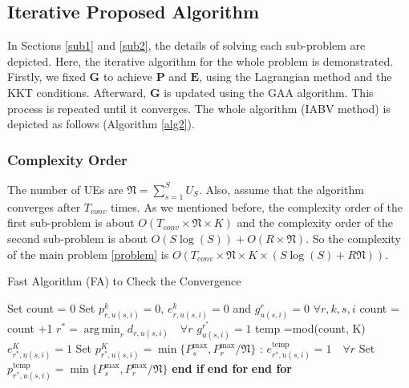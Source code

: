 \documentclass[lettersize,journal]{IEEEtran}
\DeclareMathOperator*{\argmin}{arg\,min}
\begin{document}
\subsection{Iterative Proposed Algorithm}
In Sections \eqref{sub1} and \eqref{sub2}, the details of solving each sub-problem are depicted.
Here, the iterative algorithm for the whole problem is demonstrated.
Firstly, we fixed $\boldsymbol{G}$ to achieve $\boldsymbol{P}$ and $\boldsymbol{E}$, using the Lagrangian method and the KKT conditions.
Afterward, $\boldsymbol{G}$ is updated using the GAA algorithm. This process is repeated until it converges.
The whole algorithm (IABV method) is depicted as follows (Algorithm \ref{alg2}).

\subsubsection{Complexity Order}
The number of UEs are $\mathfrak{N} = \sum_{s=1}^{S}U_S$.
Also, assume that the algorithm converges after $T_{conv}$ times.
As we mentioned before, the complexity order of the first sub-problem is about $O(T_{conv} \times \mathfrak{N} \times K)$
and the complexity order of the second sub-problem is about $O(S\log(S)) + O(R\times \mathfrak{N})$.
So the complexity of the main problem \eqref{problem} is $O(T_{conv} \times \mathfrak{N} \times K \times (S\log(S)+R\mathfrak{N}))$.
 \begin{algorithm}
 \small
\caption{Fast Algorithm (FA) to Check the Convergence}\label{alg3}
\begin{algorithmic}[1]
\State Set count = 0
\State Set $p_{r,u(s,i)}^{k} = 0$, $e_{r,u(s,i)}^{k} = 0$ and $g_{u(s,i)}^{r} = 0$ $\forall r,k,s,i$
\State count = count +1
\State $r^* = \argmin_r d_{r,u(s,i)} \quad \forall r$
\State $g_{u(s,i)} ^{r^*}=1$
\State temp =mod(count, K)
\State $e_{r^*,u(s,i)}^{K} = 1 $
\State Set $p_{r^*,u(s,i)}^{K} = \min\{P_s^{\max}, P_r^{\max}/\mathfrak{N}\} $
\Else: $e_{r^*,u(s,i)}^{\text{temp}} = 1 \quad \forall r$
\State Set $p_{r^*,u(s,i)}^{\text{temp}} = \min\{P_s^{\max}, P_r^{\max}/\mathfrak{N}\} $
\EndIf
\State \textbf{end if}
\EndFor
\State \textbf{end for}
\EndFor
\State \textbf{end for}
\end{algorithmic}
\end{algorithm}
\end{document}
